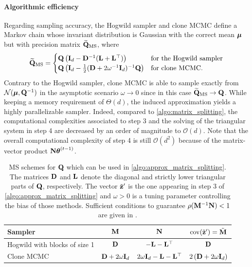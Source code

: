 \documentclass[nohypdvips,onefignum,onetabnum]{siamart171218}
\begin{document}
\paragraph{Algorithmic efficiency}
Regarding sampling accuracy, the Hogwild sampler and clone MCMC define a Markov chain whose invariant distribution is Gaussian with the correct mean $\boldsymbol{\mu}$ but with precision matrix $\widetilde{\mathbf{Q}}_{\mathrm{MS}}$, where 
\begin{equation*}
  \widetilde{\mathbf{Q}}_{\mathrm{MS}} =
    \begin{cases}
      \mathbf{Q}\left(\mathbf{I}_d - \mathbf{D}^{-1}(\mathbf{L}+\mathbf{L}^{\top})\right) & \text{for the Hogwild sampler}\\
      \mathbf{Q}\left(\mathbf{I}_d - \frac{1}{2}(\mathbf{D} + 2\omega^{-1}\mathbf{I}_d)^{-1}\mathbf{Q}\right) & \text{for clone MCMC.}
    \end{cases}       
\end{equation*}
Contrary to the Hogwild sampler, clone MCMC is able to sample exactly from $\mathcal{N}(\boldsymbol{\mu},\mathbf{Q}^{-1})$ in the asymptotic scenario $\omega \rightarrow 0$ since in this case $\widetilde{\mathbf{Q}}_{\mathrm{MS}} \rightarrow \mathbf{Q}$.
While keeping a memory requirement of $\Theta(d)$, the induced approximation yields a highly parallelizable sampler.
Indeed, compared to \cref{algo:matrix_splitting}, the computational complexities associated to step 3 and the solving of the triangular system in step 4 are decreased by an order of magnitude to $\mathcal{O}(d)$.
Note that the overall computational complexity of step 4 is still $\mathcal{O}(d^2)$ because of the matrix-vector product $\mathbf{N}\boldsymbol{\theta}^{(t-1)}$. 



\begin{table}
{\footnotesize
  \caption{MS schemes for $\mathbf{Q}$ which can be used in \cref{algo:approx_matrix_splitting}. The matrices $\mathbf{D}$ and $\mathbf{L}$ denote the diagonal and strictly lower triangular parts of $\mathbf{Q}$, respectively. The vector $\tilde{\mathbf{z}}'$ is the one appearing in step 3 of \cref{algo:approx_matrix_splitting} and $\omega > 0$ is a tuning parameter controlling the bias of those methods. Sufficient conditions to guarantee $\rho(\mathbf{M}^{-1}\mathbf{N}) < 1$ are given in \cite{Johnson2013,Barbos2017}.}
  \label{table:approx_matrix_splitting}
  \begin{center}
  {\renewcommand{\arraystretch}{1.5}
    \begin{tabular}{|l|c|c|c|} 
      \hline
      \textbf{Sampler} & $\mathbf{M}$ & $\mathbf{N}$ & $\mathrm{cov}(\tilde{\mathbf{z}}') = \tilde{\mathbf{M}}$ \\
      \hline 
      Hogwild with blocks of size 1 \cite{Johnson2013} & $\mathbf{D}$ & $-\mathbf{L} - \mathbf{L}^{\top}$ & $\mathbf{D}$ \\ 
      Clone MCMC \cite{Barbos2017} & $\mathbf{D} + 2\omega\mathbf{I}_d$ & $2\omega\mathbf{I}_d -\mathbf{L} - \mathbf{L}^{\top}$ & $2\left(\mathbf{D}+ 2\omega\mathbf{I}_d\right)$\\[0.3em]
      \hline
    \end{tabular}}
  \end{center}
}
\end{table}
\end{document}
